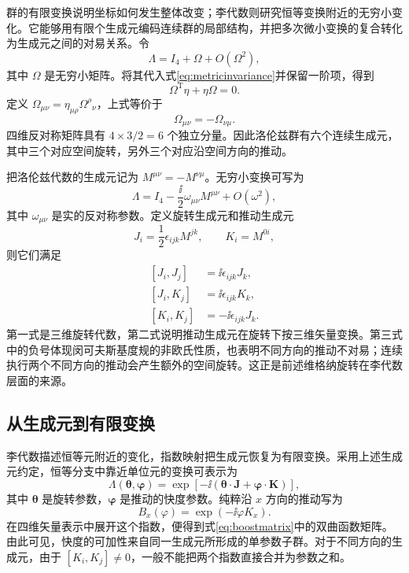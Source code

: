\documentclass[style=classic,color=full]{lc-article}
\begin{document}
群的有限变换说明坐标如何发生整体改变；李代数则研究恒等变换附近的无穷小变化。它能够用有限个生成元编码连续群的局部结构，并把多次微小变换的复合转化为生成元之间的对易关系。令
\begin{equation}
  \Lambda=I_4+\Omega+O(\Omega^2),
  \label{eq:infinitesimallorentz}
\end{equation}
其中 $\Omega$ 是无穷小矩阵。将其代入式\eqref{eq:metricinvariance}并保留一阶项，得到
\begin{equation}
  \Omega^{\mathrm T}\eta+\eta\Omega=0.
\end{equation}
定义 $\Omega_{\mu\nu}=\eta_{\mu\rho}{\Omega^\rho}_{\nu}$，上式等价于
\begin{equation}
  \Omega_{\mu\nu}=-\Omega_{\nu\mu}.
  \label{eq:omegaantisymmetric}
\end{equation}
四维反对称矩阵具有 $4\times3/2=6$ 个独立分量。因此洛伦兹群有六个连续生成元，其中三个对应空间旋转，另外三个对应沿空间方向的推动。

把洛伦兹代数的生成元记为 $M^{\mu\nu}=-M^{\nu\mu}$。无穷小变换可写为
\begin{equation}
  \Lambda
  =I_4-\frac{\ii}{2}\omega_{\mu\nu}M^{\mu\nu}
  +O(\omega^2),
\end{equation}
其中 $\omega_{\mu\nu}$ 是实的反对称参数。定义旋转生成元和推动生成元
\begin{equation}
  J_i=\frac{1}{2}\epsilon_{ijk}M^{jk},
  \qquad
  K_i=M^{0i},
\end{equation}
则它们满足
\begin{equation}
  \begin{aligned}
    [J_i,J_j]&=\ii\epsilon_{ijk}J_k,\\
    [J_i,K_j]&=\ii\epsilon_{ijk}K_k,\\
    [K_i,K_j]&=-\ii\epsilon_{ijk}J_k.
  \end{aligned}
  \label{eq:lorentzalgebra}
\end{equation}
第一式是三维旋转代数，第二式说明推动生成元在旋转下按三维矢量变换。第三式中的负号体现闵可夫斯基度规的非欧氏性质，也表明不同方向的推动不对易；连续执行两个不同方向的推动会产生额外的空间旋转。这正是前述维格纳旋转在李代数层面的来源\cite{weinberg1995}。

\subsection{从生成元到有限变换}

李代数描述恒等元附近的变化，指数映射把生成元恢复为有限变换。采用上述生成元约定，恒等分支中靠近单位元的变换可表示为
\begin{equation}
  \Lambda(\bm\theta,\bm\varphi)
  =\exp\left[-\ii\left(
    \bm\theta\mathbin{\cdot}\bm J
    +\bm\varphi\mathbin{\cdot}\bm K
  \right)\right],
  \label{eq:lorentzexponential}
\end{equation}
其中 $\bm\theta$ 是旋转参数，$\bm\varphi$ 是推动的快度参数。纯粹沿 $x$ 方向的推动写为
\begin{equation}
  B_x(\varphi)=\exp(-\ii\varphi K_x).
\end{equation}
在四维矢量表示中展开这个指数，便得到式\eqref{eq:boostmatrix}中的双曲函数矩阵。由此可见，快度的可加性来自同一生成元所形成的单参数子群。对于不同方向的生成元，由于 $[K_i,K_j]\neq0$，一般不能把两个指数直接合并为参数之和。
\end{document}
